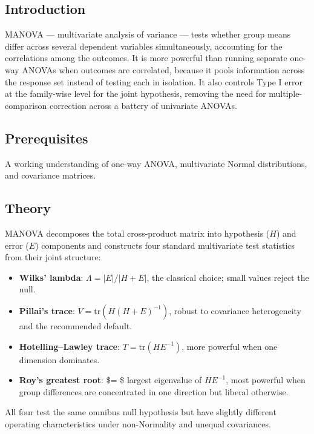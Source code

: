 \documentclass[
]{article}
\author{}
\date{\vspace{-2.5em}}
\providecommand{\tightlist}{%
  \setlength{\itemsep}{0pt}\setlength{\parskip}{0pt}}
\begin{document}
\subsection{Introduction}\label{introduction}

MANOVA --- multivariate analysis of variance --- tests whether group
means differ across several dependent variables simultaneously,
accounting for the correlations among the outcomes. It is more powerful
than running separate one-way ANOVAs when outcomes are correlated,
because it pools information across the response set instead of testing
each in isolation. It also controls Type I error at the family-wise
level for the joint hypothesis, removing the need for
multiple-comparison correction across a battery of univariate ANOVAs.

\subsection{Prerequisites}\label{prerequisites}

A working understanding of one-way ANOVA, multivariate Normal
distributions, and covariance matrices.

\subsection{Theory}\label{theory}

MANOVA decomposes the total cross-product matrix into hypothesis (\(H\))
and error (\(E\)) components and constructs four standard multivariate
test statistics from their joint structure:

\begin{itemize}
\tightlist
\item
  \textbf{Wilks' lambda}: \(\Lambda = |E| / |H + E|\), the classical
  choice; small values reject the null.
\item
  \textbf{Pillai's trace}: \(V = \mathrm{tr}(H (H + E)^{-1})\), robust
  to covariance heterogeneity and the recommended default.
\item
  \textbf{Hotelling--Lawley trace}: \(T = \mathrm{tr}(H E^{-1})\), more
  powerful when one dimension dominates.
\item
  \textbf{Roy's greatest root}: \$\theta = \$ largest eigenvalue of
  \(H E^{-1}\), most powerful when group differences are concentrated in
  one direction but liberal otherwise.
\end{itemize}

All four test the same omnibus null hypothesis but have slightly
different operating characteristics under non-Normality and unequal
covariances.
\end{document}

